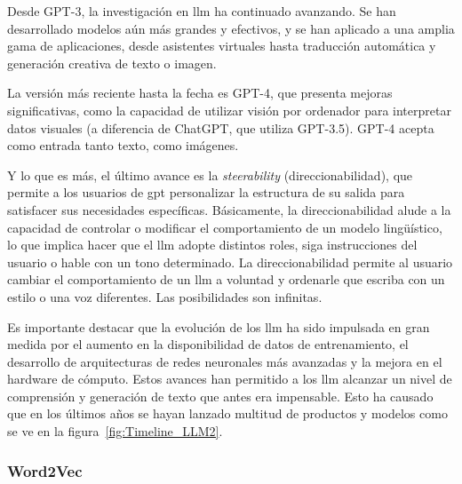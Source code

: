 \begin{description}
Desde GPT-3, la investigación en \acrshort{llm} ha continuado avanzando. Se han desarrollado modelos aún más grandes y efectivos, y se han aplicado a una amplia gama de aplicaciones, desde asistentes virtuales hasta traducción automática y generación creativa de texto o imagen.

La versión más reciente hasta la fecha es GPT-4, que presenta mejoras significativas, como la capacidad de utilizar visión por ordenador para interpretar datos visuales (a diferencia de ChatGPT, que utiliza GPT-3.5). GPT-4 acepta como entrada tanto texto, como imágenes. 

Y lo que es más, el último avance es la \textit{steerability} (direccionabilidad), que permite a los usuarios de \acrshort{gpt} personalizar la estructura de su salida para satisfacer sus necesidades específicas. Básicamente, la direccionabilidad alude a la capacidad de controlar o modificar el comportamiento de un modelo lingüístico, lo que implica hacer que el \acrshort{llm} adopte distintos roles, siga instrucciones del usuario o hable con un tono determinado. La direccionabilidad permite al usuario cambiar el comportamiento de un \acrshort{llm} a voluntad y ordenarle que escriba con un estilo o una voz diferentes. Las posibilidades son infinitas.

\end{description}


Es importante destacar que la evolución de los \acrshort{llm} ha sido impulsada en gran medida por el aumento en la disponibilidad de datos de entrenamiento, el desarrollo de arquitecturas de redes neuronales más avanzadas y la mejora en el hardware de cómputo. Estos avances han permitido a los \acrshort{llm} alcanzar un nivel de comprensión y generación de texto que antes era impensable. Esto ha causado que en los últimos años se hayan lanzado multitud de productos y modelos como se ve en la figura~\ref{fig:Timeline_LLM2}.

\subsubsection{Word2Vec}

